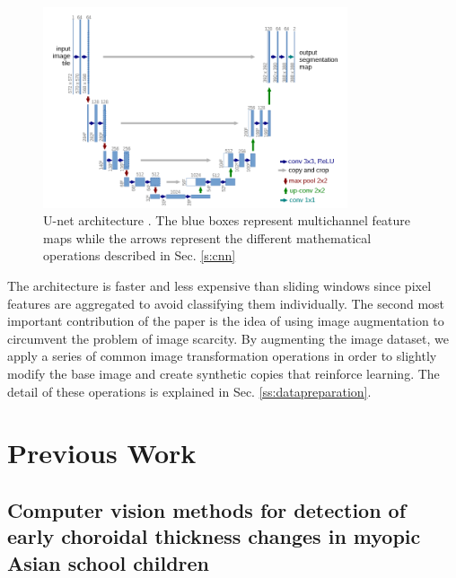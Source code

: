 \documentclass[12pt,a4paper]{scrartcl}
\begin{document}
\begin{figure}[H]
    \centering
    \includegraphics[width=0.8\textwidth]{./images/Unet-architecture.png}
    \caption{U-net architecture \cite{Ronneberger2015}. The blue boxes represent multichannel feature maps while the arrows represent the different mathematical operations described in Sec. \ref{s:cnn}    }
\end{figure}

The architecture is faster and less expensive than sliding windows since pixel features are aggregated to avoid classifying them individually. The second most important contribution of the paper is the idea of using image augmentation to circumvent the problem of image scarcity. By augmenting the image dataset, we apply a series of common image transformation operations in order to slightly modify the base image and create synthetic copies that reinforce learning. The detail of these operations is explained in Sec. \ref{ss:datapreparation}.

\section{Previous Work}\label{s:prevWork}
\subsection{Computer vision methods for detection of early choroidal thickness changes in myopic Asian school children}
\end{document}

